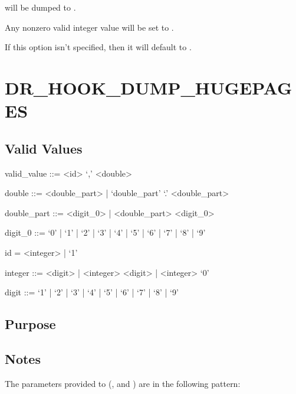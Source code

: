 \documentclass[letterpaper,10pt,english]{sphinxmanual}
\begin{document}
\sphinxAtStartPar
{} will be dumped to .

\sphinxAtStartPar
Any non\sphinxhyphen{}zero valid integer value will be set to .

\sphinxAtStartPar
If this option isn’t specified, then it will default to .


\section{DR\_HOOK\_DUMP\_HUGEPAGES}
\label{\detokenize{flag/flag:dr-hook-dump-hugepages}}\label{\detokenize{flag/flag:id208}}

\subsection{Valid Values}
\label{\detokenize{flag/flag:id209}}
\begin{DUlineblock}{0em}
\item[] valid\_value ::= \textless{}id\textgreater{} ‘,’ \textless{}double\textgreater{}
\item[] double ::= \textless{}double\_part\textgreater{} | ‘double\_part’ ‘.’ \textless{}double\_part\textgreater{}
\item[] double\_part ::= \textless{}digit\_0\textgreater{} | \textless{}double\_part\textgreater{} \textless{}digit\_0\textgreater{}
\item[] digit\_0 ::= ‘0’ | ‘1’ | ‘2’ | ‘3’ | ‘4’ | ‘5’ | ‘6’ | ‘7’ | ‘8’ | ‘9’
\item[] id = \textless{}integer\textgreater{} | ‘\sphinxhyphen{}1’
\item[] integer ::= \textless{}digit\textgreater{} | \textless{}integer\textgreater{} \textless{}digit\textgreater{} | \textless{}integer\textgreater{} ‘0’
\item[] digit ::= ‘1’ | ‘2’ | ‘3’ | ‘4’ | ‘5’ | ‘6’ | ‘7’ | ‘8’ | ‘9’
\end{DUlineblock}


\subsection{Purpose}
\label{\detokenize{flag/flag:id210}}

\subsection{Notes}
\label{\detokenize{flag/flag:id212}}
\sphinxAtStartPar
The parameters provided to  (, and ) are in the following pattern:
\end{document}
